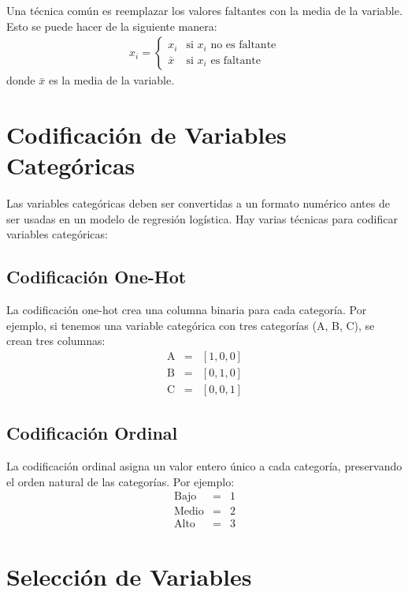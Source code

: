 \documentclass[a4paper]{report} %
\begin{document}
Una t\'ecnica com\'un es reemplazar los valores faltantes con la media de la variable. Esto se puede hacer de la siguiente manera:
\begin{eqnarray*}
x_i = \begin{cases} 
      x_i & \text{si } x_i \text{ no es faltante} \\
      \bar{x} & \text{si } x_i \text{ es faltante}
   \end{cases}
\end{eqnarray*}
donde $\bar{x}$ es la media de la variable.

\section{Codificaci\'on de Variables Categ\'oricas}

Las variables categ\'oricas deben ser convertidas a un formato num\'erico antes de ser usadas en un modelo de regresi\'on log\'istica. Hay varias t\'ecnicas para codificar variables categ\'oricas:

\subsection{Codificaci\'on One-Hot}

La codificaci\'on one-hot crea una columna binaria para cada categor\'ia. Por ejemplo, si tenemos una variable categ\'orica con tres categor\'ias (A, B, C), se crean tres columnas:
\begin{eqnarray*}
\text{A} &=& [1, 0, 0] \\
\text{B} &=& [0, 1, 0] \\
\text{C} &=& [0, 0, 1]
\end{eqnarray*}

\subsection{Codificaci\'on Ordinal}

La codificaci\'on ordinal asigna un valor entero \'unico a cada categor\'ia, preservando el orden natural de las categor\'ias. Por ejemplo:
\begin{eqnarray*}
\text{Bajo} &=& 1 \\
\text{Medio} &=& 2 \\
\text{Alto} &=& 3
\end{eqnarray*}

\section{Selecci\'on de Variables}
\end{document}
